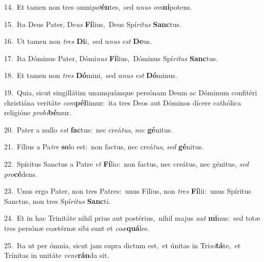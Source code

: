 {\numbfont\textcolor{\numbcolor}{14.}}~Et tamen non tres omni\-\textit{pot}\-\textbf{én}tes,~\star sed u\textit{nus} \textit{om}\-\textbf{ní}potens.\par
{\numbfont\textcolor{\numbcolor}{15.}}~Ita Deus Pater, De\textit{us} \textbf{Fí}\-lius,~\star Deus Spí\-\textit{ri}\-\textit{tus} \textbf{Sanc}\-tus.\par
{\numbfont\textcolor{\numbcolor}{16.}}~Ut tamen non \textit{tres} \textbf{Di}\-i,~\star sed u\textit{nus} \textit{est} \textbf{De}\-us.\par
{\numbfont\textcolor{\numbcolor}{17.}}~Ita Dóminus Pater, Dómi\textit{nus} \textbf{Fí}\-lius,~\star Dóminus Spí\-\textit{ri}\-\textit{tus} \textbf{Sanc}\-tus.\par
{\numbfont\textcolor{\numbcolor}{18.}}~Et tamen non \textit{tres} \textbf{Dó}\-mini,~\star sed u\textit{nus} \textit{est} \textbf{Dó}\-minus.\par
{\numbfont\textcolor{\numbcolor}{19.}}~Quia, sicut singillátim unamquámque persónam Deum ac Dóminum confitéri christiána veritáte \textit{com}\-\textbf{pél}limur:~\star ita tres Deos aut Dóminos dícere cathólica religióne \textit{pro}\-\textit{hi}\textbf{bé}mur.\par
{\numbfont\textcolor{\numbcolor}{20.}}~Pater a nullo \textit{est} \textbf{fac}\-tus:~\star nec creá\-\textit{tus}\-, \textit{nec} \textbf{gé}\-nitus.\par
{\numbfont\textcolor{\numbcolor}{21.}}~Fílius a Pa\textit{tre} \textbf{so}\-lo est:~\star non factus, nec creá\-\textit{tus}\-, \textit{sed} \textbf{gé}\-nitus.\par
{\numbfont\textcolor{\numbcolor}{22.}}~Spíritus Sanctus a Patre \textit{et} \textbf{Fí}\-lio:~\star non factus, nec creátus, nec génitus, \textit{sed} \textit{pro}\-\textbf{cé}dens.\par
{\numbfont\textcolor{\numbcolor}{23.}}~Unus ergo Pater, non tres Patres:~\dagger unus Fílius, non \textit{tres} \textbf{Fí}\-lii:~\star unus Spíritus Sanctus, non tres Spí\-\textit{ri}\-\textit{tus} \textbf{Sanc}\-ti.\par
{\numbfont\textcolor{\numbcolor}{24.}}~Et in hac Trinitáte nihil prius aut postérius,~\dagger nihil majus \textit{aut} \textbf{mi}\-nus:~\star sed totæ tres persónæ coætérnæ sibi sunt et \textit{co}\-\textit{æ}\textbf{quá}les.\par
{\numbfont\textcolor{\numbcolor}{25.}}~Ita ut per ómnia, sicut jam supra dictum est,~\dagger et únitas in Tri\-\textit{ni}\-\textbf{tá}te,~\star et Trínitas in unitáte \textit{ve}\-\textit{ne}\textbf{rán}da sit.\par
